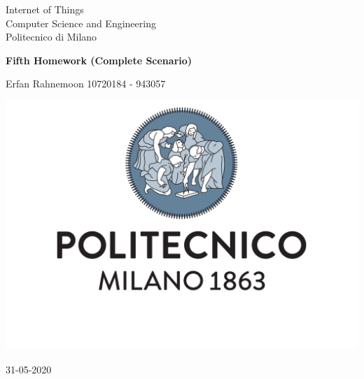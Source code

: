 \documentclass[10pt,english, openany]{book}
\begin{document}

\begin{titlepage}
	\clearpage\thispagestyle{empty}
	\centering
	\vspace{1cm}

	{\normalsize Internet of Things \\ 
		Computer Science and Engineering \\
		Politecnico di Milano \par}
		\vspace{3cm}
	{\Huge \textbf{Fifth Homework (Complete Scenario)}} \\
	\vspace{4cm}
	{\normalsize Erfan Rahnemoon 10720184 - 943057 \par}
	\vspace{5cm}
    
    \centering \includegraphics[scale=0.4]{logo1.pdf}
    
    \vspace{0.5cm}
		
	{\normalsize 31-05-2020 \par}
	

\end{titlepage}

\end{document}
